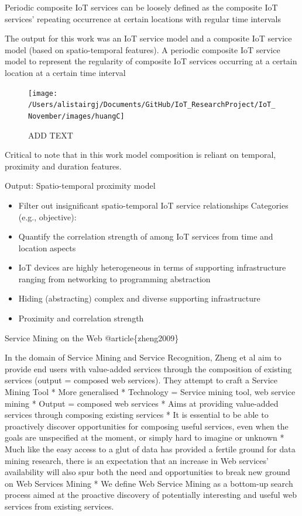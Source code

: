 \documentclass[11pt,]{article}
\providecommand{\tightlist}{%
  \setlength{\itemsep}{0pt}\setlength{\parskip}{0pt}}
\begin{document}
Periodic composite IoT services can be loosely defined as the composite
IoT services' repeating occurrence at certain locations with regular
time intervals

The output for this work was an IoT service model and a composite IoT
service model (based on spatio-temporal features). A periodic composite
IoT service model to represent the regularity of composite IoT services
occurring at a certain location at a certain time interval

\begin{figure}[H]

{\centering \texttt{[image: /Users/alistairgj/Documents/GitHub/IoT\_ResearchProject/IoT\_November/images/huangC]} 

}

\caption{ADD TEXT}\label{fig:unnamed-chunk-11}
\end{figure}

Critical to note that in this work model composition is reliant on
temporal, proximity and duration features.

Output: Spatio-temporal proximity model

\begin{itemize}
\tightlist
\item
  Filter out insignificant spatio-temporal IoT service relationships
  Categories (e.g., objective):
\item
  Quantify the correlation strength of among IoT services from time and
  location aspects
\item
  IoT devices are highly heterogeneous in terms of supporting
  infrastructure ranging from networking to programming abstraction
\item
  Hiding (abstracting) complex and diverse supporting infrastructure
\item
  Proximity and correlation strength
\end{itemize}

Service Mining on the Web @article\{zheng2009\}

In the domain of Service Mining and Service Recognition, Zheng et al aim
to provide end users with value-added services through the composition
of existing services (output = composed web services). They attempt to
craft a Service Mining Tool * More generalised * Technology = Service
mining tool, web service mining * Output = composed web services * Aims
at providing value-added services through composing existing services *
It is essential to be able to proactively discover opportunities for
composing useful services, even when the goals are unspecified at the
moment, or simply hard to imagine or unknown * Much like the easy access
to a glut of data has provided a fertile ground for data mining
research, there is an expectation that an increase in Web services'
availability will also spur both the need and opportunities to break new
ground on Web Services Mining * We define Web Service Mining as a
bottom-up search process aimed at the proactive discovery of potentially
interesting and useful web services from existing services.
\end{document}
